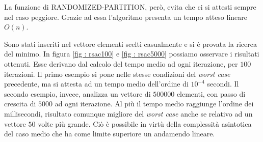 \documentclass[12pt, a4paper]{article}
\begin{document}
	La funzione di \textrm{RANDOMIZED-PARTITION}, però, evita che ci si attesti sempre nel caso peggiore. Grazie ad essa l'algoritmo presenta un tempo atteso lineare $O(n)$.
	
	Sono stati inseriti nel vettore elementi scelti casualmente e si è provata la ricerca del minimo. In figura \ref{fig : rsac100} e \ref{fig : rsac5000} possiamo osservare i risultati ottenuti. Esse derivano dal calcolo del tempo medio ad ogni iterazione, per $100$ iterazioni. Il primo esempio si pone nelle stesse condizioni del \emph{worst case} precedente, ma si attesta ad un tempo medio dell'ordine di $10^{-4}$ secondi. Il secondo esempio, invece, analizza un vettore di $500000$ elementi, con passo di crescita di $5000$ ad ogni iterazione. Al più il tempo medio raggiunge l'ordine dei millisecondi, risultato comunque migliore del \emph{worst case} anche se relativo ad un vettore $50$ volte più grande. Ciò è possibile in virtù della complessità asintotica del caso medio che ha come limite superiore un andamendo lineare.
	
\end{document}
